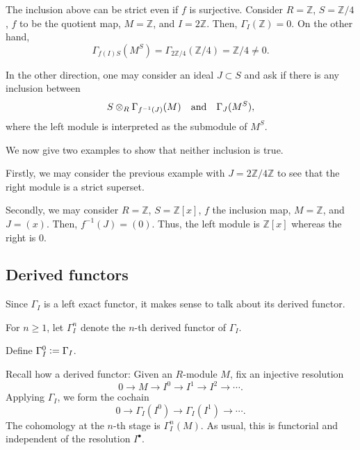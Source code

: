 \begin{ex}
	The inclusion above can be strict even if $f$ is surjective. Consider $R = \mathbb{Z}$, $S = \mathbb{Z}/4$, $f$ to be the quotient map, $M = \mathbb{Z}$, and $I = 2\mathbb{Z}$. Then, $\Gamma_{I}(\mathbb{Z}) = 0$. On the other hand,
	\begin{equation*} 
		\Gamma_{f(I)S}(M^{S}) = \Gamma_{2\mathbb{Z}/4}(\mathbb{Z}/4) = \mathbb{Z}/4 \neq 0.
	\end{equation*}
\end{ex}

\begin{ex}
	In the other direction, one may consider an ideal $J \subset S$ and ask if there is any inclusion between
	\begin{equation*} 
		S \otimes_{R} \Gamma_{f^{-1}(J)}(M) \quad\text{and}\quad \Gamma_{J}(M^{S}),
	\end{equation*}
	where the left module is interpreted as the submodule of $M^{S}$.

	We now give two examples to show that neither inclusion is true.

	Firstly, we may consider the previous example with $J = 2\mathbb{Z}/4\mathbb{Z}$ to see that the right module is a strict superset.

	Secondly, we may consider $R = \mathbb{Z}$, $S = \mathbb{Z}[x]$, $f$ the inclusion map, $M = \mathbb{Z}$, and $J = (x)$. Then, $f^{-1}(J) = (0)$. Thus, the left module is $\mathbb{Z}[x]$ whereas the right is $0$.
\end{ex}


\subsection{Derived functors}

Since $\Gamma_{I}$ is a left exact functor, it makes sense to talk about its derived functor.

\begin{defn}
	For $n \ge 1$, let $\Gamma^{n}_{I}$ denote the $n$-th derived functor of $\Gamma_{I}$.

	Define $\Gamma^{0}_{I} \vcentcolon= \Gamma_{I}$.
\end{defn}

\begin{rem}
	Recall how a derived functor: Given an $R$-module $M$, fix an injective resolution
	\begin{equation*} 
		0 \to M \to I^{0} \to I^{1} \to I^{2} \to \cdots.
	\end{equation*}
	Applying $\Gamma_{I}$, we form the cochain
	\begin{equation} \label{eq:01}
		0 \to \Gamma_{I}(I^{0}) \to \Gamma_{I}(I^{1}) \to \cdots.
	\end{equation}
	The cohomology at the $n$-th stage is $\Gamma^{n}_{I}(M)$. As usual, this is functorial and independent of the resolution $I^{\bullet}$.
\end{rem}

